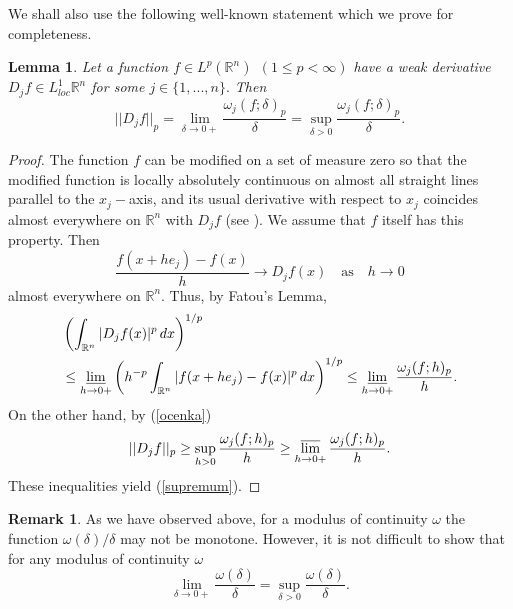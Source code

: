 \documentclass[12pt,twoside,reqno]{amsart}
\numberwithin{equation}{section}
\newtheorem{lem}[teo]{Lemma}
\theoremstyle{definition}
\newtheorem{rem}[teo]{Remark}
\numberwithin{equation}{section}
\begin{document}
We shall   also use the
following  well-known statement which we prove for completeness.
\begin{lem}\label{NABLA} Let a function $f\in L^p({\mathbb{R}}^n)~~(1\le p<\infty)$
have a weak derivative $D_jf\in L^1_{loc}{\mathbb{R}}^n$ for some  $j\in\{1,...,n\}.$ Then
\begin{equation}\label{supremum}
||D_j f||_p=\lim_{{\delta}\to 0+}\frac{{\omega}_j(f;{\delta})_p}{\delta}=\sup_{{\delta}>0}\frac{{\omega}_j(f;{\delta})_p}{\delta}.
\end{equation}
\end{lem}
\begin{proof}
The function $f$ can be modified on a set of measure zero so that the modified function is locally absolutely continuous on almost all straight lines parallel to the $x_j-$axis,
and its usual derivative with respect to $x_j$ coincides almost everywhere on ${\mathbb{R}}^n$ with $D_jf$ (see \cite[Chapter 4]{Nik}). We assume that $f$ itself has this property. Then
$$
\frac{f(x+he_j)-f(x)}{h}\to D_j f(x)\quad \mbox{as}\quad h\to 0
$$
almost everywhere on ${\mathbb{R}}^n$. Thus, by Fatou's Lemma,
$$
\begin{aligned}
&\left(\int_{{\mathbb{R}}^n}|D_j f(x)|^p\,dx\right)^{1/p}\\
&\le \varliminf_{h\to 0+}\left(h^{-p}\int_{{\mathbb{R}}^n}|f(x+he_j)-f(x)|^p\,dx\right)^{1/p}
\le \varliminf_{h\to 0+} \frac{{\omega}_j(f;h)_p}{h}.
\end{aligned}
$$
On the other hand, by (\ref{ocenka})
$$
||D_j f||_p\ge \sup_{h>0}\frac{{\omega}_j(f;h)_p}{h}\ge \varlimsup_{h\to 0+} \frac{{\omega}_j(f;h)_p}{h}.
$$
 These inequalities yield  (\ref{supremum}).
\end{proof}
\begin{rem}\label{REMA} As we have observed above, for a modulus of continuity ${\omega}$ the
function ${\omega}({\delta})/{\delta}$ may not be monotone. However, it is not difficult to show that for
any modulus of continuity ${\omega}$
$$
\lim_{{\delta}\to 0+}\frac{{\omega}({\delta})}{\delta}=\sup_{{\delta}>0}\frac{{\omega}({\delta})}{\delta}.
$$
\end{rem}
\end{document}
